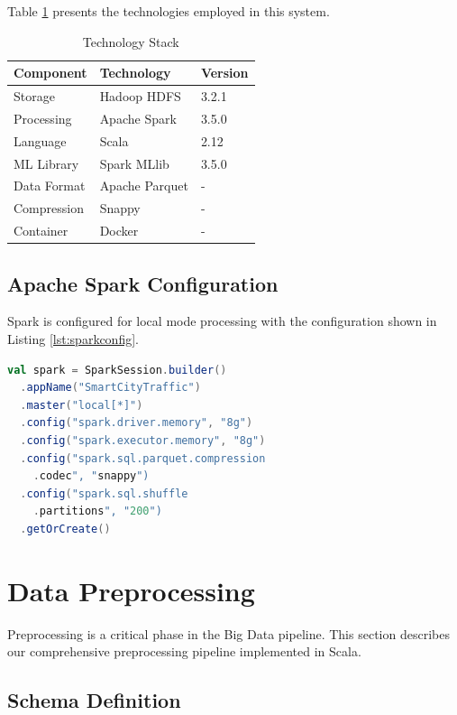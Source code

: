 \documentclass[conference]{IEEEtran}
\begin{document}
Table \ref{tab:techstack} presents the technologies employed in this system.

\begin{table}[htbp]
\caption{Technology Stack}
\begin{center}
\begin{tabular}{|l|l|l|}
\hline
\textbf{Component} & \textbf{Technology} & \textbf{Version} \\
\hline
Storage & Hadoop HDFS & 3.2.1 \\
Processing & Apache Spark & 3.5.0 \\
Language & Scala & 2.12 \\
ML Library & Spark MLlib & 3.5.0 \\
Data Format & Apache Parquet & - \\
Compression & Snappy & - \\
Container & Docker & - \\
\hline
\end{tabular}
\label{tab:techstack}
\end{center}
\end{table}

\subsection{Apache Spark Configuration}

Spark is configured for local mode processing with the configuration shown in Listing \ref{lst:sparkconfig}.

\begin{lstlisting}[caption={Spark Session Configuration},label={lst:sparkconfig},language=Scala]
val spark = SparkSession.builder()
  .appName("SmartCityTraffic")
  .master("local[*]")
  .config("spark.driver.memory", "8g")
  .config("spark.executor.memory", "8g")
  .config("spark.sql.parquet.compression
    .codec", "snappy")
  .config("spark.sql.shuffle
    .partitions", "200")
  .getOrCreate()
\end{lstlisting}

\section{Data Preprocessing}

Preprocessing is a critical phase in the Big Data pipeline. This section describes our comprehensive preprocessing pipeline implemented in Scala.

\subsection{Schema Definition}
\end{document}
